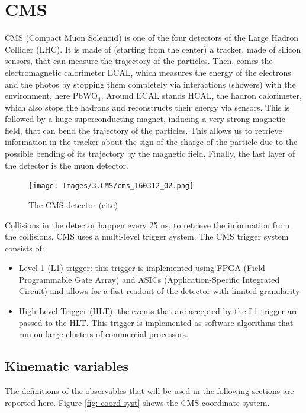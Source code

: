\section{CMS} \label{section: CMS}

CMS (Compact Muon Solenoid) is one of the four detectors of the Large Hadron Collider (LHC). It is made of (starting from the center) a tracker, made of silicon sensors, that can measure the trajectory of the particles. Then, comes the electromagnetic calorimeter ECAL, which measures the energy of the electrons and the photos by stopping them completely via interactions (showers) with the environment, here PbWO$_4$. Around ECAL stands HCAL, the hadron calorimeter, which also stops the hadrons and reconstructs their energy via sensors. This is followed by a huge superconducting magnet, inducing a very strong magnetic field, that can bend the trajectory of the particles. This allows us to retrieve information in the tracker about the sign of the charge of the particle due to the possible bending of its trajectory by the magnetic field. Finally, the last layer of the detector is the muon detector.

\begin{figure}[hbt]
    \centering
    \texttt{[image: Images/3.CMS/cms\_160312\_02.png]}
    \caption{The CMS detector (cite)}
    \label{fig: CMS detector}
\end{figure}

Collisions in the detector happen every 25 ns, to retrieve the information from the collisions, CMS uses a multi-level trigger system. The CMS trigger system consists of:
\begin{itemize}
    \item Level 1 (L1) trigger: this trigger is implemented using FPGA (Field Programmable Gate Array) and ASICs (Application-Specific Integrated Circuit) and allows for a fast readout of the detector with limited granularity
    \item High Level Trigger (HLT): the events that are accepted by the L1 trigger are passed to the HLT. This trigger is implemented as software algorithms that run on large clusters of commercial processors.
\end{itemize}

\subsection{Kinematic variables}
The definitions of the observables that will be used in the following sections are reported here. Figure \ref{fig: coord syst} shows the CMS coordinate system.

